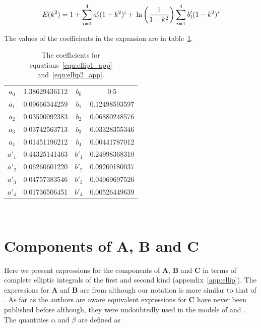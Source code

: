 \documentclass[12pt]{article}
\begin{document}
\begin{equation}
\label{equ:ellip2_app}
E(k^{2}) = 1 + \sum_{i = 1}^{4} a'_{i} (1 - k^{2})^{i} + \\\ln\left(\frac{1}{1 - k^{2}} \right) \sum_{i = 1}^{4} b'_{i} (1 - k^{2})^{i}
\end{equation}

The values of the coefficients in the expansion are in table~\ref{tab:ellip_poly_coeff}.

\begin{table}
\caption{\label{tab:ellip_poly_coeff} The coefficients for equations~\ref{equ:ellip1_app} and~\ref{equ:ellip2_app}.}
\begin{center}
\begin{tabular}{|c|c|c|c|}
\hline
$a_{0}$ & 1.38629436112 & $b_{0}$ & 0.5 \\
$a_{1}$ & 0.09666344259 & $b_{1}$ & 0.12498593597 \\
$a_{2}$ & 0.03590092383 & $b_{2}$ & 0.06880248576 \\
$a_{3}$ & 0.03742563713 & $b_{3}$ & 0.03328355346 \\
$a_{4}$ & 0.01451196212 & $b_{4}$ & 0.00441787012 \\
\hline
$a'_{1}$ & 0.44325141463 & $b'_{1}$ & 0.24998368310 \\
$a'_{2}$ & 0.06260601220 & $b'_{2}$ & 0.09200180037 \\
$a'_{3}$ & 0.04757383546 & $b'_{3}$ & 0.04069697526 \\
$a'_{4}$ & 0.01736506451 & $b'_{4}$ & 0.00526449639 \\
\hline
\end{tabular}
\end{center} 
\end{table}

\section{Components of $\boldsymbol{A}$, $\boldsymbol{B}$ and $\boldsymbol{C}$}
\label{app:mat_A}

Here we present expressions for the components of $\boldsymbol{A}$, $\boldsymbol{B}$ and $\boldsymbol{C}$ in terms of complete elliptic integrals of the first and second kind (appendix~\ref{app:ellip}). The expressions for $\boldsymbol{A}$ anf $\boldsymbol{B}$ are from \citet{Graziani89} although our notation is more similar to that of \citet{Manga94}. As far as the authors are aware equivalent expressions for $\boldsymbol{C}$ have never been published before although, they were undoubtedly used in the models of \citet{Lee82, Geller86,Manga95} and \citet{Roumeliotis00}. The quantities $\alpha$ and $\beta$ are defined as \citep{Manga94}
\end{document}

